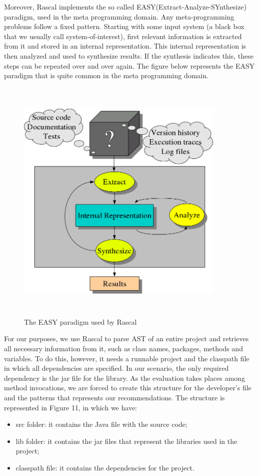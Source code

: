 Moreover, Rascal implements the so called EASY(Extract-Analyze-SYnthesize) paradigm, used in the meta programming domain. Any meta-programming problems follow a fixed pattern. Starting with some input system (a black box that we usually call system-of-interest), first relevant information is extracted from it and stored in an internal representation. This internal representation is then analyzed and used to synthesize results. If the synthesis indicates this, these steps can be repeated over and over again. The figure below represents the EASY paradigm that is quite common in the meta programming domain.

\begin{figure}[!h]
\includegraphics[width=10cm,height=12cm,keepaspectratio]{images/EASY.png}
\centering
  \caption{The EASY paradigm used by Rascal}
  \label{fig:cmd}
\end{figure}

For our purposes, we use Rascal to parse AST of an entire project and retrieves all necessary information from it, such as class names, packages, methods and variables.
To do this, however, it needs a runnable project and the classpath file in which all dependencies are specified. In our scenario, the only required dependency is the jar file for the library. As the evaluation takes places among method invocations, we are forced to create this structure for the developer's file and the patterns that represents our recommendations. The structure is represented in Figure 11, in which we have:
\begin{itemize}
\item src folder: it contains the Java file with the source code;
\item lib folder: it contains the jar files that represent the libraries used in the project;
\item classpath file: it contains the dependencies for the project.
\end{itemize}

